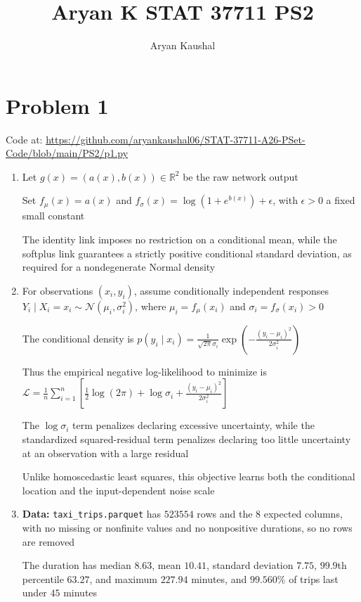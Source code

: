 \documentclass{article}
\title{Aryan K STAT 37711 PS2}
\author{Aryan Kaushal}
\begin{document}
\maketitle

\section*{Problem 1}
Code at: \url{https://github.com/aryankaushal06/STAT-37711-A26-PSet-Code/blob/main/PS2/p1.py}

\begin{enumerate}[label=\alph*.]
\item Let $g(x)=(a(x),b(x))\in\mathbb{R}^2$ be the raw network output

Set $f_\mu(x)=a(x)$ and $f_\sigma(x)=\log(1+e^{b(x)})+\epsilon$, with $\epsilon>0$ a fixed small constant

The identity link imposes no restriction on a conditional mean, while the softplus link guarantees a strictly positive conditional standard deviation, as required for a nondegenerate Normal density

\item For observations $(x_i,y_i)$, assume conditionally independent responses $Y_i\mid X_i=x_i\sim\mathcal N(\mu_i,\sigma_i^2)$, where $\mu_i=f_\mu(x_i)$ and $\sigma_i=f_\sigma(x_i)>0$

The conditional density is $p(y_i\mid x_i)=\frac{1}{\sqrt{2\pi}\sigma_i}\exp\!\left(-\frac{(y_i-\mu_i)^2}{2\sigma_i^2}\right)$

Thus the empirical negative log-likelihood to minimize is $\mathcal L=\frac{1}{n}\sum\limits_{i=1}^{n}\left[\frac{1}{2}\log(2\pi)+\log\sigma_i+\frac{(y_i-\mu_i)^2}{2\sigma_i^2}\right]$

The $\log\sigma_i$ term penalizes declaring excessive uncertainty, while the standardized squared-residual term penalizes declaring too little uncertainty at an observation with a large residual

Unlike homoscedastic least squares, this objective learns both the conditional location and the input-dependent noise scale

\item \textbf{Data:} \texttt{taxi\_trips.parquet} has $523554$ rows and the $8$ expected columns, with no missing or nonfinite values and no nonpositive durations, so no rows are removed

The duration has median $8.63$, mean $10.41$, standard deviation $7.75$, $99.9$th percentile $63.27$, and maximum $227.94$ minutes, and $99.560\%$ of trips last under $45$ minutes


\end{enumerate}
\end{document}
